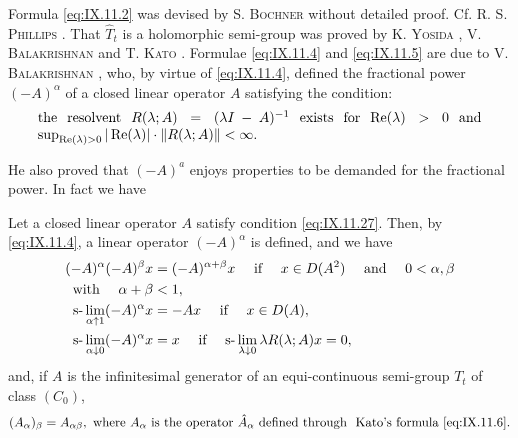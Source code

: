 \begin{remarku} Formula \eqref{eq:IX.11.2} was devised by S. \textsc{Bochner} \cite{bochner21} without detailed proof. Cf. R. S. \textsc{Phillips} \cite{phillips255}. That $\hat{T}_t$ is a holomorphic semi-group was proved by K. \textsc{Yosida} \cite{yosida351}, V. \textsc{Balakrishnan} \cite{balakrishnan8} and T. \textsc{Kato} \cite{kato135}. Formulae \eqref{eq:IX.11.4} and \eqref{eq:IX.11.5} are due to V. \textsc{Balakrishnan} \cite{balakrishnan8}, who, by virtue of \eqref{eq:IX.11.4}, defined the fractional power $(-A)^{\alpha}$ of a closed linear operator $A$ satisfying the condition: 
\begin{equation}
\label{eq:IX.11.27}
\begin{minipage}{0.92\linewidth}
\everymath{}\let\limits\nolimits
the resolvent $R (\lambda; A) = (\lambda I - A) ^{-1}$ exists for $\operatorname{Re} (\lambda) > 0$ and $\sup\limits _{\operatorname{Re} (\lambda) > 0} | \operatorname{Re} (\lambda) | \cdot \| R (\lambda; A) \| < \infty.$
\end{minipage}
\end{equation}
\end{remarku}

He also proved that $(-A)^{a}$ enjoys properties to be demanded for the fractional power. In fact we have 

\begin{theorem}\label{thm:IX.11.Theorem.3} Let a closed linear operator $A$ satisfy condition \eqref{eq:IX.11.27}. Then, by \eqref{eq:IX.11.4}, a linear operator $(-A)^{\alpha}$ is defined, and we have 
\begin{align}
(- A) ^{\alpha} (- A) ^{\beta} x& = (- A) ^{\alpha + \beta} x \quad \text{ if } \quad x \in D (A ^{2}) \quad \text{ and } \quad 0 < \alpha , \beta \notag \\
\text{ with } \quad \alpha + \beta& < 1, \label{eq:IX.11.28} \\
\text{s-}\lim _{\alpha \uparrow 1} (- A) ^{\alpha} x& = - A x \quad \text{ if } \quad x \in D (A), \label{eq:IX.11.29} \\
\text{s-}\lim _{\alpha \downarrow 0} (- A) ^{\alpha} x& = x \quad \text{ if } \quad \text{s-}\lim _{\lambda \downarrow 0} \lambda R (\lambda ; A) x = 0, \label{eq:IX.11.30}
\end{align}
and, if $A$ is the infinitesimal generator of an equi-continuous semi-group $T_{t}$ of class $(C_0)$, 
\begin{equation}(A _{\alpha}) _{\beta} = A _{\alpha \beta}, \text{ where } A _{\alpha} \text{ is the operator } \hat {A} _{\alpha} \text{ defined through } \text{ Kato's formula } \eqref{eq:IX.11.6}. \label{eq:IX.11.31}\end{equation}
\end{theorem}

